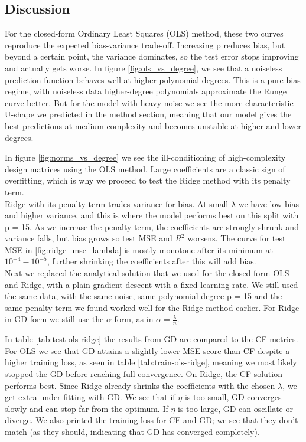 \documentclass[amssymb,twocolumn,aps,floatfix]{revtex4-2}
\begin{document}
\subsection{Discussion}

For the closed-form Ordinary Least Squares (OLS) method, these two curves reproduce the expected bias-variance trade-off. Increasing p reduces bias, but beyond a certain point, the variance dominates, so the test error stops improving and actually gets worse. In figure \ref{fig:ols_vs_degree}, we see that a noiseless prediction function behaves well at higher polynomial degrees. This is a pure bias regime, with noiseless data higher-degree polynomials approximate the Runge curve better. But for the model with heavy noise we see the more characteristic U-shape we predicted in the method section, meaning that our model gives the best predictions at medium complexity and becomes unstable at higher and lower degrees.

In figure \ref{fig:norms_vs_degree} we see the ill-conditioning of high-complexity design matrices using the OLS method. Large coefficients are a classic sign of overfitting, which is why we proceed to test the Ridge method with its penalty term. \\

Ridge with its penalty term trades variance for bias. At small $\lambda$ we have low bias and higher variance, and this is where the model performs best on this split with p = 15. As we increase the penalty term, the coefficients are strongly shrunk and variance falls, but bias grows so test MSE and $R^2$ worsens. The curve for test MSE in \ref{fig:ridge_mse_lambda} is mostly monotone after its minimum at $10^{-4}-10^{-5}$, further shrinking the coefficients after this will add bias. \\

Next we replaced the analytical solution that we used for the closed-form OLS and Ridge, with a plain gradient descent with a fixed learning rate. We still used the same data, with the same noise, same polynomial degree p = 15 and the same penalty term we found worked well for the Ridge method earlier. For Ridge in GD form we still use the $\alpha$-form, as in $\alpha=\frac{\lambda}{n}$. 

In table \ref{tab:test-ols-ridge} the results from GD are compared to the CF metrics. For OLS we see that GD attains a slightly lower MSE score than CF despite a higher training loss, as seen in table \ref{tab:train-ols-ridge}, meaning we most likely stopped the GD before reaching full convergence. On Ridge, the CF solution performs best. Since Ridge already shrinks the coefficients with the chosen $\lambda$, we get extra under-fitting with GD. We see that if $\eta$ is too small, GD converges slowly and can stop far from the optimum. If $\eta$ is too large, GD can oscillate or diverge. We also printed the training loss for CF and GD; we see that they don't match (as they should, indicating that GD has converged completely).
\end{document}
